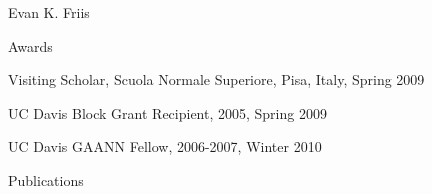 \documentclass[12pt]{amsart}
\begin{document}
\begin{cv}{Evan K. Friis}
\begin{cvlist}{Awards}
\item Visiting Scholar, Scuola Normale Superiore, Pisa, Italy, Spring 2009
\item UC Davis Block Grant Recipient, 2005, Spring 2009
\item UC Davis GAANN Fellow, 2006-2007, Winter 2010 
\end{cvlist}

\begin{cvlist}{Publications}
\item
\item 
\item
\item
\item
\end{cvlist}

\end{cv}

 
\end{document}
